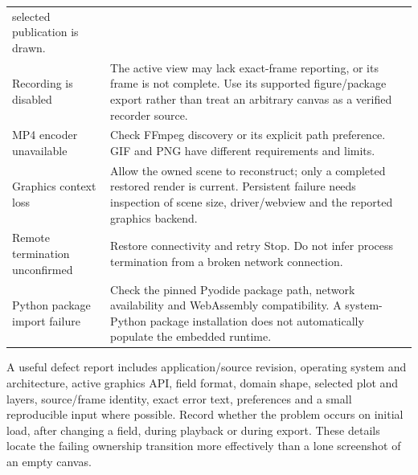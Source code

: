 \begin{longtable}{@{}p{}p{}@{}}
selected publication is drawn.\\[0.6em]
Recording is disabled & The active view may lack exact-frame reporting, or its
frame is not complete. Use its supported figure/package export rather than
treat an arbitrary canvas as a verified recorder source.\\[0.6em]
MP4 encoder unavailable & Check FFmpeg discovery or its explicit path preference.
GIF and PNG have different requirements and limits.\\[0.6em]
Graphics context loss & Allow the owned scene to reconstruct; only a completed
restored render is current. Persistent failure needs inspection of scene size,
driver/webview and the reported graphics backend.\\[0.6em]
Remote termination unconfirmed & Restore connectivity and retry Stop. Do not
infer process termination from a broken network connection.\\[0.6em]
Python package import failure & Check the pinned Pyodide package path, network
availability and WebAssembly compatibility. A system-Python package installation
does not automatically populate the embedded runtime.\\
\bottomrule
\end{longtable}

A useful defect report includes application/source revision, operating system
and architecture, active graphics API, field format, domain shape, selected
plot and layers, source/frame identity, exact error text, preferences and a
small reproducible input where possible. Record whether the problem occurs on
initial load, after changing a field, during playback or during export. These
details locate the failing ownership transition more effectively than a lone
screenshot of an empty canvas.
